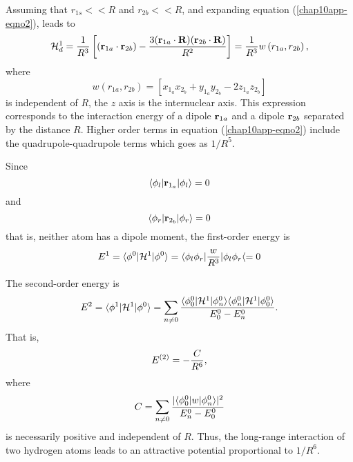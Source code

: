 Assuming that $r_{1s} < < R$ and $r_{2b} < < R$, and expanding
equation (\ref{chap10app-eqno2}), leads to
\begin{equation}
{\cal H}^1_d = {1 \over R^3} \left[ \left( {\bf r}_{1a} \cdot {\bf 
r}_{2b} \right) - {3 ( {\bf r}_{1a} \cdot {\bf R} ) ( {\bf r}_{2b} 
\cdot {\bf R} ) \over R^2} \right] = {1 \over R^3} w \left( r_{1a} , 
r_{2b} \right),
\label{chap10app-eqno3}
\end{equation}
where
\begin{equation}
w \left( r_{1a} , r_{2b} \right) = \left[ x_{1_a} x_{2_b} + 
y_{1_a} y_{2_b} - 2 z_{1_a} z_{2_b} \right]
\end{equation}
is independent of $R$, the $z$ axis is the internuclear axis.  This
expression corresponds to the interaction energy of a dipole ${\bf
r}_{1a}$ and a dipole ${\bf r}_{2b}$ separated by the distance $R$.
Higher order terms in equation (\ref{chap10app-eqno2}) include the
quadrupole-quadrupole terms which goes as $1/R^5$.

Since
\begin{equation}
\langle \phi_l | {\bf r}_{1_a} | \phi_l \rangle = 0
\end{equation}
and
\begin{equation}
\langle \phi_r | {\bf r}_{2_b} | \phi_r \rangle = 0
\end{equation}
that is, neither atom has a dipole moment, the first-order energy is
\begin{equation}
E^1 = \langle \phi^0 | {\cal H}^1 | \phi^0 \rangle = \langle \phi_l 
\phi_r | {w \over R^3} | \phi_l \phi_r \langle = 0
\end{equation}

The second-order energy is
\begin{equation}
E^2 = \langle \phi^1 | {\cal H}^1 | \phi^0 \rangle = \sum_{n \not= 
0} {\langle \phi^0_0 | {\cal H}^1 | \phi^0_n \rangle \langle 
\phi^0_n | {\cal H}^1 | \phi^0_0 \rangle \over E^0_0 - E^0_n} .
\end{equation}
That is,
\begin{equation}
E^{(2)} = - {C \over R^6},
\label{chap10app-eqno4}
\end{equation}
where
\begin{equation}
C = \sum_{n \not= 0} {| \langle \phi^0_0 | w | \phi^0_n \rangle 
|^2 \over E^0_n - E^0_0}
\end{equation}
is necessarily positive and independent of $R$.  Thus, the long-range 
interaction of two hydrogen atoms leads to an attractive potential 
proportional to $1/R^6$.


